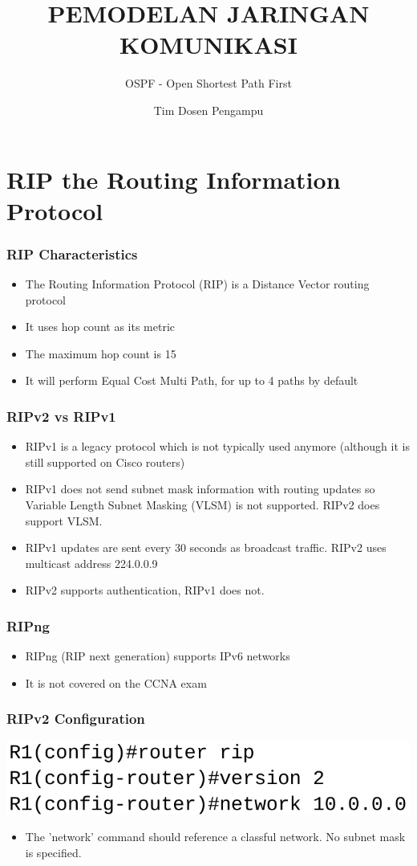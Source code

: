 \documentclass[pdflatex,compress,mathserif]{beamer}
\title{PEMODELAN JARINGAN KOMUNIKASI}
\subtitle{OSPF - Open Shortest Path First}
\author{Tim Dosen Pengampu}
\begin{document}
	
\maketitle

\section{RIP the Routing Information Protocol}

\begin{frame}
	\frametitle{RIP Characteristics}
	\begin{itemize}
		\item The Routing Information Protocol (RIP) is a Distance Vector
routing protocol
		\item It uses hop count as its metric
		\item The maximum hop count is 15
		\item It will perform Equal Cost Multi Path, for up to 4 paths by default
	\end{itemize}
\end{frame}

\begin{frame}
	\frametitle{RIPv2 vs RIPv1}
	\begin{itemize}
		\item RIPv1 is a legacy protocol which is not typically used anymore
(although it is still supported on Cisco routers)
		\item RIPv1 does not send subnet mask information with routing
updates so Variable Length Subnet Masking (VLSM) is not
supported. RIPv2 does support VLSM.
		\item RIPv1 updates are sent every 30 seconds as broadcast traffic.
RIPv2 uses multicast address 224.0.0.9
		\item RIPv2 supports authentication, RIPv1 does not.
	\end{itemize}
\end{frame}

\begin{frame}
	\frametitle{RIPng}
	\begin{itemize}
		\item RIPng (RIP next generation) supports IPv6 networks
		\item It is not covered on the CCNA exam
	\end{itemize}
\end{frame}

\begin{frame}
	\frametitle{RIPv2 Configuration}
	\begin{center}
		\includegraphics[width=0.7\linewidth]{img/img01}
	\end{center}
	\begin{itemize}
		\item The 'network' command should reference a classful network. No subnet
mask is specified.
	\end{itemize}
\end{frame}
\end{document}

